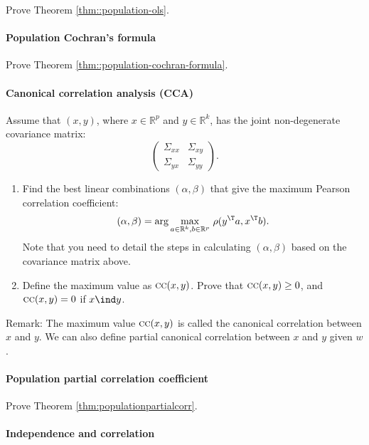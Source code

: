 Prove Theorem \ref{thm::population-ols}. 


\paragraph{Population Cochran's formula}\label{hw11::population-cochran}

Prove Theorem \ref{thm::population-cochran-formula}. 


\paragraph{Canonical correlation analysis (CCA)}\label{hw11::cca}

Assume that $(x,y)$, where $x \in \mathbb{R}^p$ and $y \in \mathbb{R}^k$, has the joint non-degenerate covariance matrix:
$$
\begin{pmatrix}
\Sigma_{xx} & \Sigma_{xy} \\
\Sigma_{yx} & \Sigma_{yy}
\end{pmatrix}. 
$$
\begin{enumerate}
\item
Find the best linear combinations $(\alpha, \beta)$ that
give the maximum Pearson correlation coefficient:
\[
(\alpha, \beta) = 
\text{\ensuremath{\arg\max_{a \in \mathbb{R}^k ,  b \in \mathbb{R}^p}}}\ \rho(y^{\T}a,x^{\T}b).
\]
Note that you need to detail the steps in calculating $(\alpha, \beta)$ based on the covariance matrix above.

\item
Define the maximum value as $\textsc{cc}(x,y)$. Prove that $\textsc{cc}(x,y) \geq 0$, and $\textsc{cc}(x,y) = 0$ if $x\ind y$. 
\end{enumerate}

Remark: The maximum value $\textsc{cc}(x,y)$ is called the canonical correlation between $x$ and $y$. 
We can also define partial canonical correlation between $x$ and $y$ given $w$.

\paragraph{Population partial correlation coefficient}\label{hw11::population-partial-correlation}

Prove Theorem \ref{thm:populationpartialcorr}. 




\paragraph{Independence and correlation}\label{hw11::independence-correlation}

